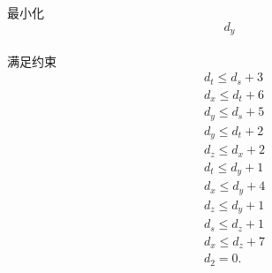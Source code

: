 \documentclass[a4paper, justified]{tufte-handout}
\begin{document}
\begin{problem}[TC 29.2-2]
\end{problem}

\begin{solution}
  最小化 $$d_y$$\\
  满足约束\\
  $$
    \begin{aligned}
       & d_t \leq d_s+3 \\
       & d_x \leq d_t+6 \\
       & d_y \leq d_s+5 \\
       & d_y \leq d_t+2 \\
       & d_z \leq d_x+2 \\
       & d_t \leq d_y+1 \\
       & d_x \leq d_y+4 \\
       & d_z \leq d_y+1 \\
       & d_s \leq d_z+1 \\
       & d_x \leq d_z+7 \\
       & d_2=0 .
    \end{aligned}
  $$
\end{solution}

\begin{problem}[TC 29.2-4]
\end{problem}
\end{document}
